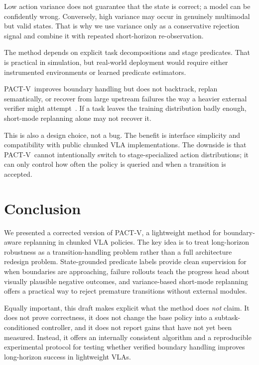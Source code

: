 \documentclass[10pt]{article}
\newcommand{\method}{\textsc{PACT-V}\xspace}
\begin{document}
Low action variance does not guarantee that the state is correct; a model can be
confidently wrong.
Conversely, high variance may occur in genuinely multimodal but valid states.
That is why we use variance only as a conservative rejection signal and combine
it with repeated short-horizon re-observation.

The method depends on explicit task decompositions and stage predicates.
That is practical in simulation, but real-world deployment would require either
instrumented environments or learned predicate estimators.

\method\ improves boundary handling but does not backtrack, replan semantically,
or recover from large upstream failures the way a heavier external verifier might
attempt~\cite{cyclevla}.
If a task leaves the training distribution badly enough, short-mode replanning
alone may not recover it.

This is also a design choice, not a bug.
The benefit is interface simplicity and compatibility with public chunked VLA
implementations.
The downside is that \method\ cannot intentionally switch to stage-specialized
action distributions; it can only control how often the policy is queried and
when a transition is accepted.

\section{Conclusion}

We presented a corrected version of \method, a lightweight method for
boundary-aware replanning in chunked VLA policies.
The key idea is to treat long-horizon robustness as a transition-handling
problem rather than a full architecture redesign problem.
State-grounded predicate labels provide clean supervision for when boundaries are
approaching, failure rollouts teach the progress head about visually plausible
negative outcomes, and variance-based short-mode replanning offers a practical
way to reject premature transitions without external modules.

Equally important, this draft makes explicit what the method does \emph{not}
claim.
It does not prove correctness, it does not change the base policy into a
subtask-conditioned controller, and it does not report gains that have not yet
been measured.
Instead, it offers an internally consistent algorithm and a reproducible
experimental protocol for testing whether verified boundary handling improves
long-horizon success in lightweight VLAs.
\end{document}
